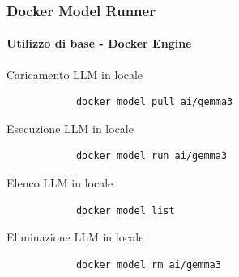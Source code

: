 %
\begin{frame}[t,fragile] \frametitle{Docker Model Runner}
    \framesubtitle{Utilizzo di base - Docker Engine}
        \begin{codeblock}{Caricamento LLM in locale}
            \begin{verbatim}
            docker model pull ai/gemma3
            \end{verbatim}
        \end{codeblock}
        \begin{codeblock}{Esecuzione LLM in locale}
            \begin{verbatim}
            docker model run ai/gemma3
            \end{verbatim}
        \end{codeblock}
        \begin{codeblock}{Elenco LLM in locale}
            \begin{verbatim}
            docker model list
            \end{verbatim}
        \end{codeblock}
        \begin{codeblock}{Eliminazione LLM in locale}
            \begin{verbatim}
            docker model rm ai/gemma3
            \end{verbatim}
        \end{codeblock}
\end{frame}
%
